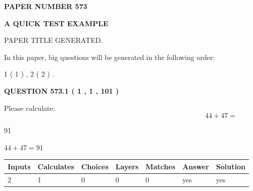 \documentclass[12pt]{article}
\begin{document}
   
   
   
 {\textbf{ \Large{ PAPER NUMBER  573  }}}
   
   
\vspace{0.2in}
   
   
   
   
   
   
   
   
 \vspace{0.2in}
{\LARGE {\textbf{ A QUICK TEST EXAMPLE}}}
   
   
 PAPER TITLE GENERATED.
   
   
   
\vspace{0.2in}
   
In this paper, big questions will be generated in the following order: 
   
   
   1 ( 1 )
 ,
   2 ( 2 )
 .
  
\vspace{0.2in}
  
{\textbf{\Large{QUESTION
573.1 
 ( 1 , 1 , 101 )
}}}
  
  
 
Please calculate:
\begin{equation}
44 +  %
47 = \nonumber
\end{equation}
 
 
 
\noindent{}
 
 

91
 
 
\noindent{}
 
 

 
 
 
\noindent{}
 
 

$ %
44 +  %
47=   %
91$
 
 
\noindent{}
 
 

 
   
   
   
   
\noindent\begin{tabular}{|l|l|l|l|l|l|l|}
 \hline
Inputs & Calculates & Choices & Layers & Matches & Answer & Solution \\ \hline
 2  & 
 1  & 
 0
  & 
 0  & 
 0  & 
  yes & 
  yes 
  \\ \hline
 \end{tabular}
   
\end{document}
